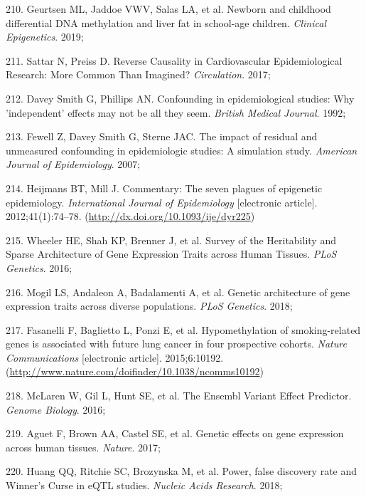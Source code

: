\documentclass[11pt,twoside]{bristolthesis}
\newenvironment{cslreferences}%
  {}%
  {\par}
\begin{document}
\begin{cslreferences}
\leavevmode\hypertarget{ref-Geurtsen2019}{}%
210. Geurtsen ML, Jaddoe VWV, Salas LA, et al. Newborn and childhood differential DNA methylation and liver fat in school-age children. \emph{Clinical Epigenetics}. 2019;

\leavevmode\hypertarget{ref-Sattar2017}{}%
211. Sattar N, Preiss D. Reverse Causality in Cardiovascular Epidemiological Research: More Common Than Imagined? \emph{Circulation}. 2017;

\leavevmode\hypertarget{ref-DaveySmith1992}{}%
212. Davey Smith G, Phillips AN. Confounding in epidemiological studies: Why 'independent' effects may not be all they seem. \emph{British Medical Journal}. 1992;

\leavevmode\hypertarget{ref-Fewell2007}{}%
213. Fewell Z, Davey Smith G, Sterne JAC. The impact of residual and unmeasured confounding in epidemiologic studies: A simulation study. \emph{American Journal of Epidemiology}. 2007;

\leavevmode\hypertarget{ref-Heijmans2012}{}%
214. Heijmans BT, Mill J. Commentary: The seven plagues of epigenetic epidemiology. \emph{International Journal of Epidemiology} {[}electronic article{]}. 2012;41(1):74--78. (\url{http://dx.doi.org/10.1093/ije/dyr225})

\leavevmode\hypertarget{ref-Wheeler2016}{}%
215. Wheeler HE, Shah KP, Brenner J, et al. Survey of the Heritability and Sparse Architecture of Gene Expression Traits across Human Tissues. \emph{PLoS Genetics}. 2016;

\leavevmode\hypertarget{ref-Mogil2018}{}%
216. Mogil LS, Andaleon A, Badalamenti A, et al. Genetic architecture of gene expression traits across diverse populations. \emph{PLoS Genetics}. 2018;

\leavevmode\hypertarget{ref-Fasanelli2015}{}%
217. Fasanelli F, Baglietto L, Ponzi E, et al. Hypomethylation of smoking-related genes is associated with future lung cancer in four prospective cohorts. \emph{Nature Communications} {[}electronic article{]}. 2015;6:10192. (\url{http://www.nature.com/doifinder/10.1038/ncomms10192})

\leavevmode\hypertarget{ref-McLaren2016}{}%
218. McLaren W, Gil L, Hunt SE, et al. The Ensembl Variant Effect Predictor. \emph{Genome Biology}. 2016;

\leavevmode\hypertarget{ref-Aguet2017}{}%
219. Aguet F, Brown AA, Castel SE, et al. Genetic effects on gene expression across human tissues. \emph{Nature}. 2017;

\leavevmode\hypertarget{ref-Huang2018}{}%
220. Huang QQ, Ritchie SC, Brozynska M, et al. Power, false discovery rate and Winner's Curse in eQTL studies. \emph{Nucleic Acids Research}. 2018;


\end{cslreferences}
\end{document}
